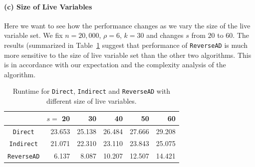 \documentclass[final,leqno,onefignum,onetabnum]{siamart}
\begin{document}
\paragraph{(c) Size of Live Variables} 
Here we want to see how the performance changes as we vary the size of the live variable set.
We fix $n = 20,000$, $\rho = 6$, $k = 30$ and changes $s$ from $20$ to $60$. The results (summarized in Table~\ref{tab:live} suggest that performance of {\tt ReverseAD} is much more sensitive to the size of live variable set than the other two algorithms. This is in accordance with our expectation and the complexity analysis of the algorithm.
\begin{table}[htbp]
\begin{center}
\begin{tabular}{ | c | r | r | r | r | r |}
\hline
& $s=$ 20 & 30 & 40 & 50 & 60 \\
\hline
{\tt Direct} & 23.653 & 25.138 & 26.484 & 27.666 & 29.208\\
{\tt Indirect} & 21.071 & 22.310 & 23.110 & 23.843 & 25.075\\
{\tt ReverseAD} & 6.137 & 8.087 & 10.207 & 12.507 & 14.421\\
\hline 
\end{tabular}
\caption{Runtime for {\tt Direct}, {\tt Indirect} and {\tt ReverseAD} with different size of live variables.}
\label{tab:live}
\end{center}
\end{table}
\end{document}

